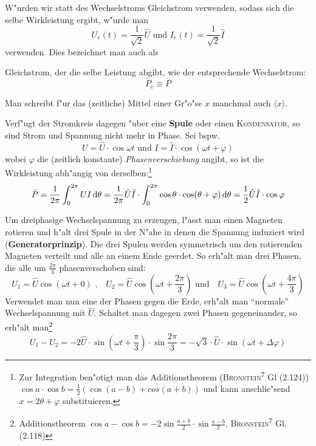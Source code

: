 W"urden wir statt des Wechselstroms Gleichstrom verwenden, sodass sich die
selbe Wirkleistung ergibt, w"urde man
\begin{equation}
   \label{eq:347}
   U_e(t) = \frac{1}{\sqrt{2}} \hat U \text{ und }    I_e(t) = \frac{1}{\sqrt{2}} \hat I
\end{equation}
verwenden. Dies bezeichnet man auch als
\begin{Def}
   Gleichstrom, der die selbe Leistung abgibt, wie der entsprechende
   Wechselstrom:
$$\bar P_e \equiv \bar P$$
\end{Def}
Man schreibt f"ur das (zeitliche) Mittel einer Gr"o"se $x$ manchmal auch
$\langle x \rangle$.

\bigskip

Verf"ugt der Stromkreis dagegen "uber eine \textbf{Spule} oder einen
\textsc{Kondensator}, so sind Strom und Spannung nicht mehr in
Phase. Sei bspw.
\begin{equation*}
   U = \hat U \cdot \cos \omega t \text{ und } I = \hat I \cdot \cos
   (\omega t + \varphi)
\end{equation*}
wobei $\varphi$ die (zeitlich konstante) \emph{Phasenverschiebung} angibt, so ist die
Wirkleistung abh"angig von derselben:\footnote{Zur Integration
  ben"otigt man das Additionstheorem (\textsc{Bronstein}\textsuperscript{7} Gl (2.124))
  $\cos a \cdot \cos b = \frac{1}{2} \left ( \cos(a-b) + cos(a+b)
  \right )$ und kann anschlie"send $x = 2\theta + \varphi$
  substituieren.}
\begin{equation*}
   \bar P = \frac{1}{2\pi} \int_0^{2\pi} U I \, \mathrm{d} \theta =
   \frac{1}{2\pi} \hat U \hat I \cdot \int_0^{2\pi} \cos\theta \cdot
   \cos(\theta + \varphi) \, \mathrm{d} \theta = \frac{1}{2} \hat U \hat I
   \cdot \cos \varphi
\end{equation*}


\bigskip Um dreiphasige Wechselspannung zu erzeugen, l"asst man einen
Magneten rotieren und h"alt drei Spule in der N"ahe in denen die
Spannung induziert wird
(\textbf{Generatorprinzip}). Die drei Spulen
werden symmetrisch um den rotierenden Magneten verteilt und alle an
einem Ende geerdet. So erh"alt man drei Phasen, die alle um
$\frac{2\pi}{3}$ phasenverschoben sind:
\begin{equation*}
   \label{eq:348}
   U_1 = \hat U \cos(\omega t + 0) \text{ , ~ }
   U_2 = \hat U \cos(\omega t + \frac{2\pi}{3}) \text{ und ~ }
   U_3 = \hat U \cos(\omega t + \frac{4\pi}{3})
\end{equation*}
Verwendet man nun eine der Phasen gegen die Erde, erh"alt man
"`normale"' Wechselspannung mit $\hat U$. Schaltet man dagegen zwei
Phasen gegeneinander, so erh"alt man\footnote{Additionstheorem $\cos a
  - \cos b = -2 \sin \frac{a + b}{2} \cdot \sin \frac{a-b}{2}$,
  \textsc{Bronstein}\textsuperscript{7} Gl. (2.118)}
\begin{equation*}
    U_1 - U_2  = -2 \hat U \cdot \sin (\omega t + \frac{\pi}{3}) \cdot \sin
   \frac{2\pi}{3}  = - \sqrt{3} \cdot \hat U \cdot \sin (\omega t + \Delta \varphi)
\end{equation*}

